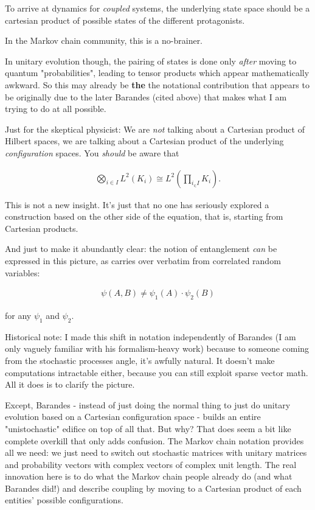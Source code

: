 \documentclass{article}
\begin{document}
To arrive at dynamics for \textit{coupled} systems, the underlying state space should be a cartesian product of possible states of the different protagonists.

In the Markov chain community, this is a no-brainer.

In unitary evolution though, the pairing of states is done only \textit{after} moving to quantum "probabilities", leading to tensor products which appear mathematically awkward. So this may already be \textbf{the} the notational contribution that appears to be originally due to the later Barandes (cited above) that makes what I am trying to do at all possible.

Just for the skeptical physicist: We are \textit{not} talking about a Cartesian product of Hilbert spaces, we are talking about a Cartesian product of the underlying \textit{configuration} spaces. You \textit{should} be aware that 

\begin{align*}
\bigotimes_{i \in I} L^2(K_i) \cong L^2(\prod_{i_\in I}K_i).
\end{align*}

This is not a new insight. It's just that no one has seriously explored a construction based on the other side of the equation, that is, starting from Cartesian products.

And just to make it abundantly clear: the notion of entanglement \textit{can} be expressed in this picture, as carries over verbatim from correlated random variables:

\begin{align*}
\psi(A, B) \neq \psi_1(A) \cdot \psi_2(B)
\end{align*}

for any $\psi_1$ and $\psi_2$.

Historical note: I made this shift in notation independently of Barandes (I am only vaguely familiar with his formalism-heavy work) because to someone coming from the stochastic processes angle, it's awfully natural. It doesn't make computations intractable either, because you can still exploit sparse vector math. All it does is to clarify the picture.

Except, Barandes - instead of just doing the normal thing to just do unitary evolution based on a Cartesian configuration space - builds an entire "unistochastic" edifice on top of all that. But why? That does seem a bit like complete overkill that only adds confusion. The Markov chain notation provides all we need: we just need to switch out stochastic matrices with unitary matrices and probability vectors with complex vectors of complex unit length. The real innovation here is to do what the Markov chain people already do (and what Barandes did!) and describe coupling by moving to a Cartesian product of each entities' possible configurations.
\end{document}
